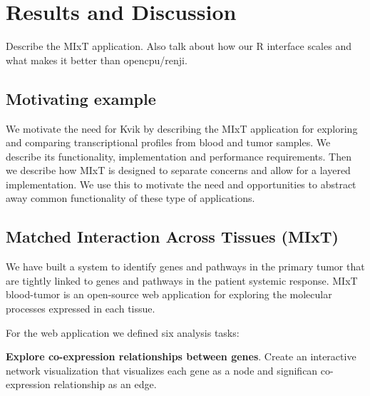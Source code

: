 
\section*{Results and Discussion}
Describe the MIxT application. Also talk about how our R interface scales and
what makes it better than opencpu/renji.


\subsection*{Motivating example}



We motivate the need for Kvik by describing the MIxT application for exploring
and comparing transcriptional profiles from blood and tumor samples. We
describe its functionality, implementation 
and performance requirements.
Then we describe how MIxT
is designed to separate concerns and allow for a layered implementation. We use
this to motivate the need and opportunities to abstract away common
functionality of these type of applications.

\subsection*{Matched Interaction Across Tissues (MIxT)}
We have built a system to identify genes and pathways in the primary tumor that
are tightly linked to genes and pathways in the patient systemic
response\cite{dumeaux2017}. MIxT blood-tumor is an open-source web application
for exploring the molecular processes expressed in each tissue. 

For the web application we defined six analysis tasks: 

\textbf{Explore co-expression relationships between genes}. Create an
interactive network visualization that visualizes each gene as a node and
significan co-expression relationship as an edge. 

